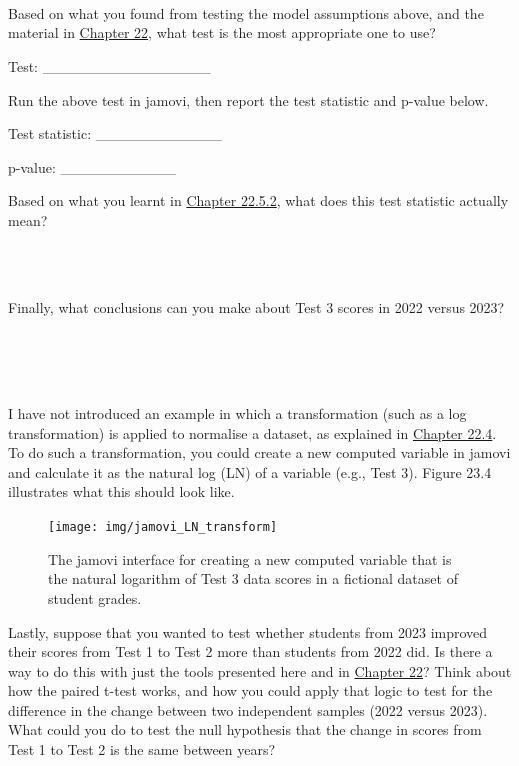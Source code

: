 \documentclass[
  openany]{scrbook}
\begin{document}
\begin{verbatim}




\end{verbatim}

Based on what you found from testing the model assumptions above, and the material in \protect\hyperlink{Chapter_22}{Chapter 22}, what test is the most appropriate one to use?

Test: \_\_\_\_\_\_\_\_\_\_\_\_\_\_\_\_

Run the above test in jamovi, then report the test statistic and p-value below.

Test statistic: \_\_\_\_\_\_\_\_\_\_\_\_

p-value: \_\_\_\_\_\_\_\_\_\_\_

Based on what you learnt in \protect\hyperlink{mann-whitney-u-test}{Chapter 22.5.2}, what does this test statistic actually mean?

\begin{verbatim}



\end{verbatim}

Finally, what conclusions can you make about Test 3 scores in 2022 versus 2023?

\begin{verbatim}




\end{verbatim}

I have not introduced an example in which a transformation (such as a log transformation) is applied to normalise a dataset, as explained in \protect\hyperlink{assumptions-of-t-tests}{Chapter 22.4}.
To do such a transformation, you could create a new computed variable in jamovi and calculate it as the natural log (LN) of a variable (e.g., Test 3).
Figure 23.4 illustrates what this should look like.

\begin{figure}
\texttt{[image: img/jamovi\_LN\_transform]} \caption{The jamovi interface for creating a new computed variable that is the natural logarithm of Test 3 data scores in a fictional dataset of student grades.}\label{fig:unnamed-chunk-92}
\end{figure}

Lastly, suppose that you wanted to test whether students from 2023 improved their scores from Test 1 to Test 2 more than students from 2022 did.
Is there a way to do this with just the tools presented here and in \protect\hyperlink{Chapter_22}{Chapter 22}?
Think about how the paired t-test works, and how you could apply that logic to test for the difference in the change between two independent samples (2022 versus 2023).
What could you do to test the null hypothesis that the change in scores from Test 1 to Test 2 is the same between years?
\end{document}
